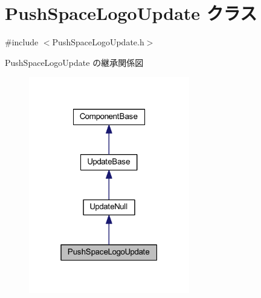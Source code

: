 \hypertarget{class_push_space_logo_update}{}\section{Push\+Space\+Logo\+Update クラス}
\label{class_push_space_logo_update}


{\ttfamily \#include $<$Push\+Space\+Logo\+Update.\+h$>$}



Push\+Space\+Logo\+Update の継承関係図\nopagebreak
\begin{figure}[H]
\begin{center}
\leavevmode
\includegraphics[width=199pt]{class_push_space_logo_update__inherit__graph}
\end{center}
\end{figure}
